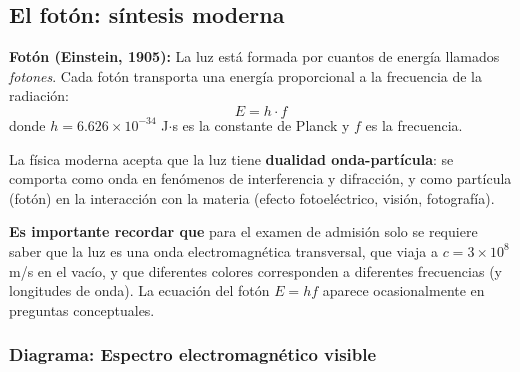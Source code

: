 \subsection{El fotón: síntesis moderna}

\begin{seccion}
\begin{definicion}
\textbf{Fotón (Einstein, 1905):} La luz está formada por cuantos de energía llamados \textit{fotones}. Cada fotón transporta una energía proporcional a la frecuencia de la radiación:
$$E = h \cdot f$$
donde $h = 6.626 \times 10^{-34}$ J$\cdot$s es la constante de Planck y $f$ es la frecuencia.
\end{definicion}

La física moderna acepta que la luz tiene \textbf{dualidad onda-partícula}: se comporta como onda en fenómenos de interferencia y difracción, y como partícula (fotón) en la interacción con la materia (efecto fotoeléctrico, visión, fotografía).

\begin{nota}
\textbf{Es importante recordar que} para el examen de admisión solo se requiere saber que la luz es una onda electromagnética transversal, que viaja a $c = 3 \times 10^8$ m/s en el vacío, y que diferentes colores corresponden a diferentes frecuencias (y longitudes de onda). La ecuación del fotón $E = hf$ aparece ocasionalmente en preguntas conceptuales.
\end{nota}
\end{seccion}

\subsubsection{Diagrama: Espectro electromagnético visible}

